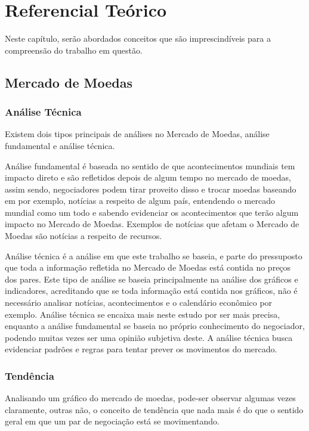 \chapter[Referencial Teórico]{Referencial Teórico}

Neste capítulo, serão abordados conceitos que são imprescindíveis para a compreensão do trabalho em questão.

\section{Mercado de Moedas}

\subsection{Análise Técnica}
Existem dois tipos principais de análises no Mercado de Moedas, análise fundamental e análise técnica.\cite{kumar}

Análise fundamental é baseada no sentido de que acontecimentos mundiais tem impacto direto e são refletidos depois de algum tempo no mercado de moedas, assim sendo,
negociadores podem tirar proveito disso e trocar moedas baseando em por exemplo, notícias a respeito de algum país, entendendo o mercado
mundial como um todo e sabendo evidenciar os acontecimentos que terão algum impacto no Mercado de Moedas. Exemplos de notícias que afetam
o Mercado de Moedas são notícias a respeito de recursos.\cite{baresa}

Análise técnica é a análise em que este trabalho se baseia, e parte do pressuposto que toda a informação refletida no Mercado de Moedas está
contida no preços dos pares. Este tipo de análise se baseia principalmente na análise dos gráficos e indicadores, acreditando que se toda
informação está contida nos gráficos, não é necessário analisar notícias, acontecimentos e o calendário econômico por exemplo. Análise técnica
se encaixa mais neste estudo por ser mais precisa, enquanto a análise fundamental se baseia no próprio conhecimento do negociador, podendo muitas
vezes ser uma opinião subjetiva deste. A análise técnica busca evidenciar padrões e regras para tentar prever os movimentos do mercado. \cite{taylor}

\subsection{Tendência}

Analisando um gráfico do mercado de moedas, pode-ser observar algumas vezes claramente, outras não, o conceito de tendência que nada mais é
do que o sentido geral em que um par de negociação está se movimentando.\cite{werner}

